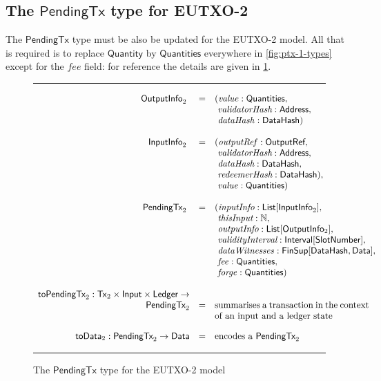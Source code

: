 \documentclass[a4paper]{article}
\renewcommand{\i}{\textit}  %
\newcommand{\s}{\textsf}  %
\newcommand{\msf}[1]{\ensuremath{\mathsf{#1}}}
\newcommand{\mi}[1]{\ensuremath{\mathit{#1}}}
\newcommand\rfskip{7pt}
\newenvironment{ruledfigure}[1]{\begin{figure}[#1]\hrule\vspace{\rfskip}}{\vspace{\rfskip}\hrule\end{figure}}
\newcommand{\List}[1]{\ensuremath{\s{List}[#1]}}
\newcommand{\Interval}[1]{\ensuremath{\s{Interval}[#1]}}
\newcommand{\FinSup}[2]{\ensuremath{\s{FinSup}[#1,#2]}}
\newcommand{\ptx}{\ensuremath{\s{PendingTx}}}
\newcommand{\toData}{\ensuremath{\s{toData}}}
\newcommand{\toPendingTx}{\ensuremath{\s{toPendingTx}}}
\newcommand{\Address}{\ensuremath{\s{Address}}}
\newcommand{\DataHash}{\ensuremath{\s{DataHash}}}
\newcommand{\forge}{\mi{forge}}
\newcommand{\fee}{\mi{fee}}
\newcommand{\val}{\mi{value}}  %
\newcommand{\dataHash}{\mi{dataHash}}
\newcommand{\dataWits}{\mi{dataWitnesses}}
\newcommand{\Data}{\ensuremath{\s{Data}}}
\newcommand{\outputref}{\mi{outputRef}}
\newcommand{\slotnum}{\ensuremath{\s{SlotNumber}}}
\newcommand{\eutxotx}{\msf{Tx}}
\newcommand{\qty}{\ensuremath{\s{Quantity}}}
\newcommand{\qtymap}{\ensuremath{\s{Quantities}}}
\newcommand\N{\ensuremath{\mathbb{N}}}
\begin{document}
\subsection{The \ptx{} type for EUTXO-2}
\label{sec:pendingtx-2}
The \ptx{} type must be also be updated for the EUTXO-2 model.  All
that is required is to replace \qty{} by \qtymap{} everywhere in
\cref{fig:ptx-1-types} except for the \fee{} field: for reference
the details are given in \cref{fig:ptx-2-types}.
\begin{ruledfigure}{H}
  \begin{displaymath}
  \begin{array}{rll}
    \s{OutputInfo}_2\s{ } &=&(\val: \qtymap,\\
                          & &\ \i{validatorHash}: \Address,\\
                          & &\ \dataHash: \DataHash)\\
    \\
    \s{InputInfo}_2\s{ } &=& (\outputref: \s{OutputRef},\\
                         & &\ \i{validatorHash}: \Address,\\
                         & &\ \i{dataHash}: \DataHash,\\
                         & &\ \i{redeemerHash}: \DataHash),\\
                         & &\ \val: \qtymap)\\
     \\
     \ptx_2\s{ } &=&(\i{inputInfo}: \List{\s{InputInfo}_2},\\
                 & &\ \i{thisInput}: \N,\\
                 & &\ \i{outputInfo}: \List{\s{OutputInfo$_2$}},\\
                 & &\ \i{validityInterval}: \Interval{\slotnum},\\
                 & &\ \dataWits: \FinSup{\DataHash}{\Data},\\
                 & &\ \fee: \qtymap,\\
                 & &\ \forge: \qtymap)\\
    \\
    \toPendingTx_2: \eutxotx_2 \times \s{Input} \times \s{Ledger} \rightarrow&\\
    
      \ptx_2 &=& \mbox{\parbox[t]{6cm}{summarises a transaction in the context of an input and a ledger state}}\\
     \\
    \toData_2: \ptx_2 \rightarrow \Data &=& \mbox{encodes a $\ptx_2$}
  \end{array}
  \end{displaymath}
  \caption{The \ptx{} type for the EUTXO-2 model}
  \label{fig:ptx-2-types}
\end{ruledfigure}
\end{document}
